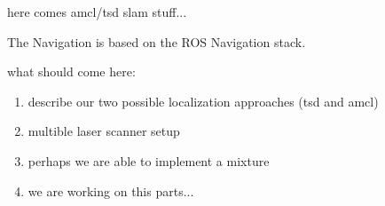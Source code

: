 here comes amcl/tsd slam stuff...

The Navigation is based on the ROS Navigation stack.

what should come here:
\begin{enumerate}
	\item describe our two possible localization approaches (tsd and amcl)
	\item multible laser scanner setup
	\item perhaps we are able to implement a mixture
	\item we are working on this parts...
\end{enumerate}